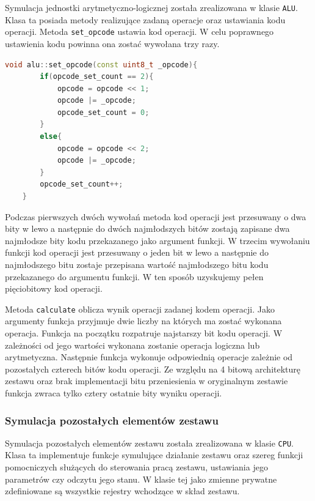 \documentclass[../main.tex]{subfiles}
\begin{document}
Symulacja jednostki arytmetyczno-logicznej została zrealizowana w klasie \texttt{ALU}.
Klasa ta posiada metody realizujące zadaną operacje oraz ustawiania kodu operacji. Metoda \texttt{set\_opcode} ustawia kod operacji.
W celu poprawnego ustawienia kodu powinna ona zostać wywołana trzy razy.

\begin{lstlisting}[language=C++]
    void alu::set_opcode(const uint8_t _opcode){
        if(opcode_set_count == 2){
            opcode = opcode << 1;
            opcode |= _opcode;
            opcode_set_count = 0;
        }
        else{
            opcode = opcode << 2;
            opcode |= _opcode;
        }
        opcode_set_count++;
    }
\end{lstlisting}

Podczas pierwszych dwóch wywołań metoda kod operacji jest przesuwany o dwa bity w lewo a następnie do dwóch najmłodszych bitów zostają
zapisane dwa najmłodsze bity kodu przekazanego jako argument funkcji. W trzecim wywołaniu funkcji kod operacji jest przesuwany o jeden bit w lewo
a następnie do najmłodszego bitu zostaje przepisana wartość najmłodszego bitu kodu przekazanego do argumentu funkcji. W ten sposób uzyskujemy
pełen pięciobitowy kod operacji. 
\par
Metoda \texttt{calculate} oblicza wynik operacji zadanej kodem operacji. Jako argumenty funkcja przyjmuje dwie liczby na których ma zostać wykonana
operacja. Funkcja na początku rozpatruje najstarszy bit kodu operacji. W zależności od jego wartości wykonana zostanie operacja logiczna lub arytmetyczna.
Następnie funkcja wykonuje odpowiednią operacje zależnie od pozostałych czterech bitów kodu operacji. Ze względu na 4 bitową architekturę zestawu oraz
brak implementacji bitu przeniesienia w oryginalnym zestawie funkcja zwraca tylko cztery ostatnie bity wyniku operacji. 

\subsubsection{Symulacja pozostałych elementów zestawu}

Symulacja pozostałych elementów zestawu została zrealizowana w klasie \texttt{CPU}. Klasa ta implementuje funkcje symulujące działanie zestawu oraz
szereg funkcji pomocniczych służących do sterowania pracą zestawu, ustawiania jego parametrów czy odczytu jego stanu.
W klasie tej jako zmienne prywatne zdefiniowane są wszystkie rejestry wchodzące w skład zestawu.
\end{document}
